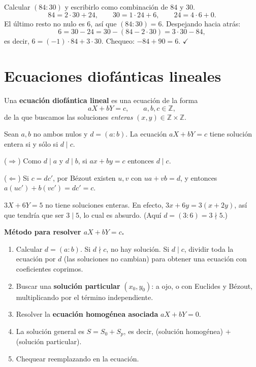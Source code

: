 \begin{ejemplo}
Calcular $(84:30)$ y escribirlo como combinación de $84$ y $30$.
\[
84=2\cdot 30+24, \qquad 30=1\cdot 24+6, \qquad 24=4\cdot 6+0.
\]
El último resto no nulo es $6$, así que $(84:30)=6$. Despejando hacia atrás:
\[
6=30-24=30-(84-2\cdot 30)=3\cdot 30-84,
\]
es decir, $6=(-1)\cdot 84+3\cdot 30$. Chequeo: $-84+90=6$. $\checkmark$
\end{ejemplo}

\section{Ecuaciones diofánticas lineales}

\begin{definicion}
Una \textbf{ecuación diofántica lineal} es una ecuación de la forma
\[
aX+bY=c, \qquad a,b,c\in\mathbb{Z},
\]
de la que buscamos las soluciones \emph{enteras} $(x,y)\in\mathbb{Z}\times\mathbb{Z}$.
\end{definicion}

\begin{proposicion}[{title={Criterio de existencia}}]
Sean $a,b$ no ambos nulos y $d=(a:b)$. La ecuación $aX+bY=c$ tiene solución
entera si y sólo si $d\mid c$.
\end{proposicion}

\begin{demostracion}
($\Rightarrow$) Como $d\mid a$ y $d\mid b$, si $ax+by=c$ entonces $d\mid c$.

($\Leftarrow$) Si $c=dc'$, por Bézout existen $u,v$ con $ua+vb=d$, y entonces
$a(uc')+b(vc')=dc'=c$.
\end{demostracion}

\begin{ejemplo}
$3X+6Y=5$ no tiene soluciones enteras. En efecto, $3x+6y=3(x+2y)$, así que
tendría que ser $3\mid 5$, lo cual es absurdo. (Aquí $d=(3:6)=3\nmid 5$.)
\end{ejemplo}

\begin{nota}
\textbf{Método para resolver $aX+bY=c$.}
\begin{enumerate}
    \item Calcular $d=(a:b)$. Si $d\nmid c$, no hay solución. Si $d\mid c$,
    dividir toda la ecuación por $d$ (las soluciones no cambian) para obtener una
    ecuación con coeficientes coprimos.
    \item Buscar una \textbf{solución particular} $(x_0,y_0)$: a ojo, o con
    Euclides y Bézout, multiplicando por el término independiente.
    \item Resolver la \textbf{ecuación homogénea asociada} $aX+bY=0$.
    \item La solución general es $S=S_0+S_p$, es decir, (solución homogénea) $+$
    (solución particular).
    \item Chequear reemplazando en la ecuación.
\end{enumerate}
\end{nota}

